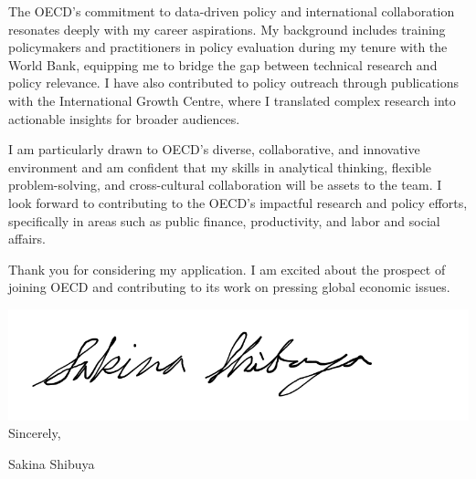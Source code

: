 \documentclass[12pt]{letter}
\begin{document}
The OECD's commitment to data-driven policy and international collaboration resonates deeply with my career aspirations. 
My background includes training policymakers and practitioners in policy evaluation during my tenure with the World Bank, 
equipping me to bridge the gap between technical research and policy relevance. I have also contributed to policy outreach 
through publications with the International Growth Centre, where I translated complex research into actionable insights for broader audiences.

I am particularly drawn to OECD’s diverse, collaborative, and innovative environment and am confident that my skills in analytical thinking, 
flexible problem-solving, and cross-cultural collaboration will be assets to the team. I look forward to contributing to the OECD's impactful research and policy efforts, 
specifically in areas such as public finance, productivity, and labor and social affairs.

Thank you for considering my application. I am excited about the prospect of joining OECD and contributing to its work on pressing global economic issues.

\bigskip

\includegraphics[height=4\baselineskip]{signature.png}  \\

\vspace*{-6.5\baselineskip}Sincerely, 

\vspace{2.5\baselineskip}Sakina Shibuya
\end{document}
